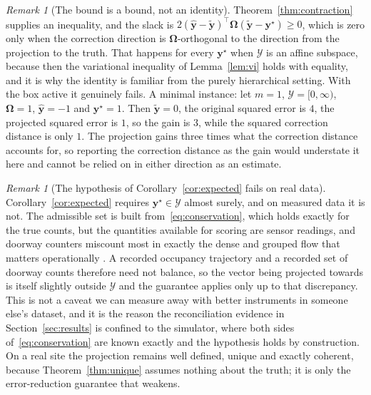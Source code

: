 \documentclass[utf8]{FrontiersinHarvard}
\newif\ifrevisionmarkup
\newcommand{\new}[1]{\ifrevisionmarkup\textcolor{revision}{#1}\else#1\fi}
\newif\ifsecondrevisionmarkup
\newcommand{\rev}[1]{\ifsecondrevisionmarkup\textcolor{revisiontwo}{#1}\else#1\fi}
\theoremstyle{plain}
\theoremstyle{definition}
\theoremstyle{remark}
\newtheorem{remark}[theorem]{Remark}
\newcommand{\by}{\bm{y}}
\newcommand{\bOm}{\bm{\Omega}}
\newcommand{\yhat}{\hat{\by}}
\newcommand{\ytil}{\tilde{\by}}
\newcommand{\cY}{\mathcal{Y}}
\begin{document}
\begin{remark}[The bound is a bound, not an identity]
\label{rem:notequality}
\new{\rev{The gap does not in general \emph{equal} $\mathbb{E}\|\yhat-\ytil\|_{\bOm}^{2}$:} Theorem~\ref{thm:contraction} supplies an inequality, and the slack is $2(\yhat-\ytil)^{\top}\bOm(\ytil-\by^{\star}) \ge 0$, which is zero only when the correction direction is $\bOm$-orthogonal to the direction from the projection to the truth. That happens for every $\by^{\star}$ when $\cY$ is an affine subspace, because then the variational inequality of Lemma~\ref{lem:vi} holds with equality, and it is why the identity is familiar from the purely hierarchical setting. With the box active it genuinely fails. A minimal instance: let $m=1$, $\cY = [0,\infty)$, $\bOm = 1$, $\yhat = -1$ and $\by^{\star} = 1$. Then $\ytil = 0$, the original squared error is $4$, the projected squared error is $1$, so the gain is $3$, while the squared correction distance is only $1$. The projection gains three times what the correction distance accounts for, so reporting the correction distance as the gain would understate it here and cannot be relied on in either direction as an estimate.}
\end{remark}

\begin{remark}[The hypothesis of Corollary~\ref{cor:expected} fails on real data]
\label{rem:admissible}
Corollary~\ref{cor:expected} requires $\by^{\star} \in \cY$ almost surely, and on measured data it is not. The admissible set is built from~\eqref{eq:conservation}, which holds exactly for the true counts, but the quantities available for scoring are sensor readings, and doorway counters miscount most in exactly the dense and grouped flow that matters operationally \citep{brscic2013}. A recorded occupancy trajectory and a recorded set of doorway counts therefore need not balance, so the vector being projected towards is itself slightly outside $\cY$ and the guarantee applies only up to that discrepancy. This is not a caveat we can measure away with better instruments in someone else's dataset, and it is the reason the reconciliation evidence in Section~\ref{sec:results} is confined to the simulator, where both sides of~\eqref{eq:conservation} are known exactly and the hypothesis holds by construction. On a real site the projection remains well defined, unique and exactly coherent, because Theorem~\ref{thm:unique} assumes nothing about the truth; it is only the error-reduction guarantee that weakens.
\end{remark}
\end{document}

